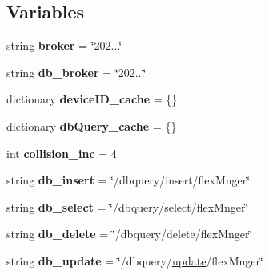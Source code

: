 \subsection*{Variables}
\begin{DoxyCompactItemize}
\item 
\hypertarget{namespaceflexIDMnger_a7921a1547a604812b8598511ec7510b1}{string {\bfseries broker} = \char`\"{}202...\char`\"{}}\label{namespaceflexIDMnger_a7921a1547a604812b8598511ec7510b1}

\item 
\hypertarget{namespaceflexIDMnger_a25d68df4dd27bd82ff34da80173196b8}{string {\bfseries db\-\_\-broker} = \char`\"{}202...\char`\"{}}\label{namespaceflexIDMnger_a25d68df4dd27bd82ff34da80173196b8}

\item 
\hypertarget{namespaceflexIDMnger_a410887fb1e5741855597352a40e77a16}{dictionary {\bfseries device\-I\-D\-\_\-cache} = \{\}}\label{namespaceflexIDMnger_a410887fb1e5741855597352a40e77a16}

\item 
\hypertarget{namespaceflexIDMnger_a5cbd9153a4dcde4ba9c238730f139570}{dictionary {\bfseries db\-Query\-\_\-cache} = \{\}}\label{namespaceflexIDMnger_a5cbd9153a4dcde4ba9c238730f139570}

\item 
\hypertarget{namespaceflexIDMnger_a5f94c1426e81cb817d657b1ae5837d8c}{int {\bfseries collision\-\_\-inc} = 4}\label{namespaceflexIDMnger_a5f94c1426e81cb817d657b1ae5837d8c}

\item 
\hypertarget{namespaceflexIDMnger_a1981fc00829b540f8d58471de23e3acd}{string {\bfseries db\-\_\-insert} = \char`\"{}/dbquery/insert/flex\-Mnger\char`\"{}}\label{namespaceflexIDMnger_a1981fc00829b540f8d58471de23e3acd}

\item 
\hypertarget{namespaceflexIDMnger_a423e288f8377fcad63137ba3798070e3}{string {\bfseries db\-\_\-select} = \char`\"{}/dbquery/select/flex\-Mnger\char`\"{}}\label{namespaceflexIDMnger_a423e288f8377fcad63137ba3798070e3}

\item 
\hypertarget{namespaceflexIDMnger_a386574d9419f6dfafb0b9110c8523bbd}{string {\bfseries db\-\_\-delete} = \char`\"{}/dbquery/delete/flex\-Mnger\char`\"{}}\label{namespaceflexIDMnger_a386574d9419f6dfafb0b9110c8523bbd}

\item 
\hypertarget{namespaceflexIDMnger_a3cc825d50191d10077c31adec3a44cbe}{string {\bfseries db\-\_\-update} = \char`\"{}/dbquery/\hyperlink{namespaceflexIDMnger_adedec16e54018954285353ecad9197db}{update}/flex\-Mnger\char`\"{}}\label{namespaceflexIDMnger_a3cc825d50191d10077c31adec3a44cbe}


\end{DoxyCompactItemize}
